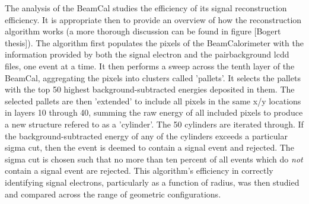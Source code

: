 \documentclass{report}
\begin{document}
            The analysis of the BeamCal studies the efficiency of its signal reconstruction efficiency. It is appropriate then to provide an overview of how the reconstruction algorithm works (a more thorough discussion can be found in figure [Bogert thesis]). The algorithm first populates the pixels of the BeamCalorimeter with the information provided by both the signal electron and the pairbackground lcdd files, one event at a time. It then performs a sweep across the tenth layer of the BeamCal, aggregating the pixels into clusters called 'pallets'. It selects the pallets with the top 50 highest background-subtracted energies deposited in them. The selected pallets are then 'extended' to include all pixels in the same x/y locations in layers 10 through 40, summing the raw energy of all included pixels to produce a new structure refered to as a 'cylinder'. The 50 cylinders are iterated through. If the background-subtracted energy of any of the cylinders exceeds a particular sigma cut, then the event is deemed to contain a signal event and rejected. The sigma cut is chosen such that no more than ten percent of all events which do \textit{not} contain a signal event are rejected. This algorithm's efficiency in correctly identifying signal electrons, particularly as a function of radius, was then studied and compared across the range of geometric configurations.







        
    
\end{document}
